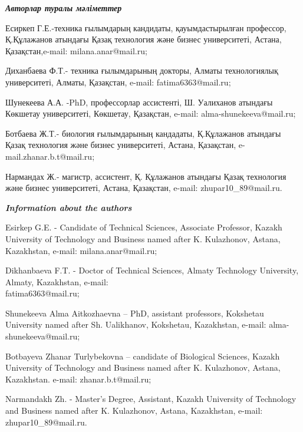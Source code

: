 \begin{authorinfo}
\emph{{\bfseries Авторлар туралы мәліметтер}}

Есиркеп Г.Е.-техника ғылымдарың кандидаты, қауымдастырылған профессор,
Қ.Құлажанов атындағы Қазақ технология және бизнес университеті, Астана,
Қазақстан,e-mail: milana.anar@mail.ru;

Диханбаева Ф.Т.- техника ғылымдарының докторы, Алматы технологиялық
университеті, Алматы, Қазақстан, e-mail: fatima6363@mail.ru;

Шунекеева А.А. -PhD, профессорлар ассистенті, Ш. Уалиханов атындағы
Көкшетау университеті, Көкшетау, Қазақстан, e-mail:
alma-shunekeeva@mail.ru;

Ботбаева Ж.Т.- биология ғылымдарының кандадаты, Қ.Құлажанов атындағы
Қазақ технология және бизнес университеті, Астана, Қазақстан,
e-mail.zhanar.b.t@mail.ru;

Нармандах Ж.- магистр, ассистент, Қ. Құлажанов атындағы Қазақ технология
және бизнес университеті, Астана, Қазақстан, e-mail:
zhupar10\_89@mail.ru.

\emph{{\bfseries Information about the authors}}

Esirkep G.E. - Candidate of Technical Sciences, Associate Professor,
Kazakh University of Technology and Business named after K. Kulazhonov,
Astana, Kazakhstan, e-mail: milana.anar@mail.ru;

Dikhanbaeva F.T. - Doctor of Technical Sciences, Almaty Technology
University, Almaty, Kazakhstan, e-mail: \\fatima6363@mail.ru;

Shunekeeva Alma Aitkozhaevna -- PhD, assistant professors, Kokshetau
University named after Sh. Ualikhanov, Kokshetau, Kazakhstan, e-mail:
alma-shunekeeva@mail.ru;

Botbayeva Zhanar Turlybekovna -- candidate of Biological Sciences,
Kazakh University of Technology and Business named after K. Kulazhonov,
Astana, Kazakhstan. e-mail: zhanar.b.t@mail.ru;

Narmandakh Zh. - Master's Degree, Assistant, Kazakh University of
Technology and Business named after K. Kulazhonov, Astana, Kazakhstan,
e-mail: zhupar10\_89@mail.ru.
\end{authorinfo}
